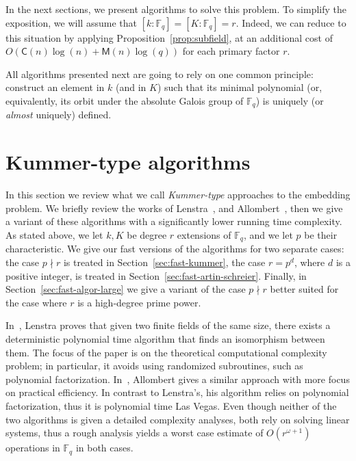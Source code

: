 \documentclass[12pt]{article}
\theoremstyle{plain}
\theoremstyle{definition}
\def\F{\ensuremath{\mathbb{F}}}
\def\MM{\ensuremath{\mathsf{M}}}
\def\CC{\ensuremath{\mathsf{C}}}
\newcounter{algorithm}
\begin{document}
In the next sections, we present algorithms to solve this problem. To
simplify the exposition, we will assume that $[k:\F_q]=[K:\F_q]=r$.
Indeed, we can reduce to this situation by applying
Proposition~\ref{prop:subfield}, at an additional cost of
$O(\CC(n)\log(n) + \MM(n)\log(q))$ for each primary factor $r$.

All algorithms presented next are going to rely on one common
principle: construct an element in $k$ (and in $K$) such that its
minimal polynomial (or, equivalently, its orbit under the absolute
Galois group of $\F_q$) is uniquely (or \emph{almost} uniquely)
defined.






\section{Kummer-type algorithms}
\label{sec:kummer}

In this section we review what we call \emph{Kummer-type} approaches to the embedding problem. 
We briefly review the works of Lenstra~\cite{LenstraJr91}, and Allombert~\cite{Allombert02}, then 
we give a variant of these algorithms with a significantly lower running time complexity.
As stated above, we let $k,K$ be degree $r$ extensions of $\F_q$, and we let $p$ be their
characteristic.
We give our fast versions of the algorithms for two separate cases: the case $p \nmid r$
is treated in Section~\ref{sec:fast-kummer}, the case $r = p^d$, where $d$ 
is a positive integer, is treated in Section~\ref{sec:fast-artin-schreier}.
Finally, in Section~\ref{sec:fast-algor-large} we give a variant of the case
$p \nmid r$ better suited for the case where $r$ is a high-degree prime power.

In~\cite{LenstraJr91}, Lenstra proves that 
given two finite fields of the same size, there exists a deterministic polynomial time algorithm 
that finds an isomorphism between them. The focus of the paper is on the theoretical computational
complexity problem; in particular, it avoids using randomized subroutines, such as polynomial
factorization. 
In~\cite{Allombert02}, Allombert gives a similar approach with more focus on practical efficiency.
In contrast to Lenstra's, his algorithm relies on polynomial factorization, thus it is
polynomial time Las Vegas.
Even though neither of the two algorithms is given a detailed complexity analyses, both rely
on solving linear systems, thus a rough analysis yields a worst case estimate of $O(r^{\omega+1})$ operations
in $\F_q$ in both cases.
\end{document}
